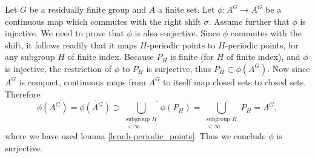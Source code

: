 Let $G$ be a residually finite group and $A$ a finite set. Let $\phi: A^G \to A^G$ be a continuous map which commutes with the right shift $\sigma$. Assume further that $\phi$ is injective. We need to prove that $\phi$ is also surjective. Since $\phi$ commutes with the shift, it follows readily that it maps $H$-periodic points to $H$-periodic points, for any subgroup $H$ of finite index.
Because $P_H$ is finite (for $H$ of finite index), and $\phi$ is injective, the restriction of $\phi$ to $P_H$ is surjective, thus $P_H \subset \phi(A^G)$. Now since $A^G$ is compact, continuous maps from $A^G$ to itself map closed sets to closed sets. Therefore
\[
\phi(A^G) = \overline{\phi(A^G)} \supset
\overline{\bigcup_{\substack{\text{subgroup } H \\ [G : H] < \infty}}\phi( P_H)}
= \overline{\bigcup_{\substack{\text{subgroup } H \\ [G : H] < \infty}} P_H} = A^G,
\]
where we have used lemma \ref{lem:h-periodic_points}. Thus we conclude $\phi$ is surjective.
